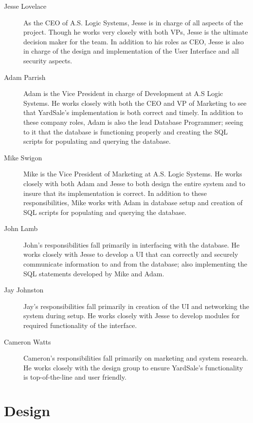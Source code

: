 \documentclass{report}
\begin{document}
\begin{itemize}
    \begin{description}
        \item[Jesse Lovelace] As the CEO of A.S. Logic Systems,
        Jesse is in charge of all aspects of the project.  Though
        he works very closely with both VPs, Jesse is the ultimate
        decision maker for the team.  In addition to his roles as
        CEO, Jesse is also in charge of the design and
        implementation of the User Interface and all security
        aspects.
        \item[Adam Parrish] Adam is the Vice President in charge
        of Development at A.S Logic Systems.  He works closely
        with both the CEO and VP of Marketing to see that
        YardSale's implementation is both correct and timely.  In
        addition to these company roles, Adam is also the lead
        Database Programmer; seeing to it that the database is
        functioning properly and creating the SQL scripts for
        populating and querying the database.
        \item[Mike Swigon] Mike is the Vice President of
        Marketing at A.S. Logic Systems.  He works closely with
        both Adam and Jesse to both design the entire system and
        to insure that its implementation is correct.  In addition
        to these responsibilities, Mike works with Adam in database
        setup and creation of SQL scripts for populating and
        querying the database.
        \item[John Lamb] John's responsibilities fall primarily in
        interfacing with the database.  He works closely with Jesse
        to develop a UI that can correctly and securely
        communicate information to and from the database; also
        implementing the SQL statements developed by Mike and
        Adam.
        \item[Jay Johnston] Jay's responsibilities fall primarily
        in creation of the UI and networking the system during
        setup.  He works closely with Jesse to develop modules
        for required functionality of the interface.
        \item[Cameron Watts] Cameron's responsibilities fall
        primarily on marketing and system research.  He works
        closely with the design group to ensure YardSale's
        functionality is top-of-the-line and user friendly.
    \end{description}


\chapter{Design}


\end{itemize}
\end{document}
